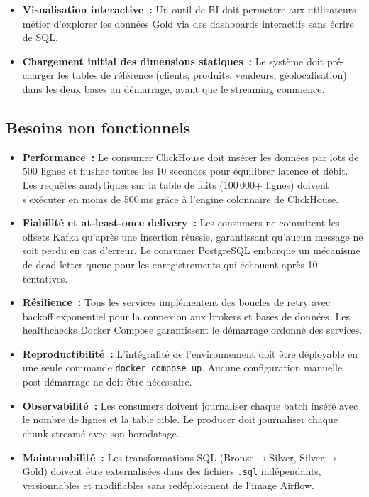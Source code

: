 \begin{itemize}
\item \textbf{Visualisation interactive~:} Un outil de BI doit permettre aux utilisateurs métier d'explorer les données Gold via des dashboards interactifs sans écrire de SQL.

\item \textbf{Chargement initial des dimensions statiques~:} Le système doit pré-charger les tables de référence (clients, produits, vendeurs, géolocalisation) dans les deux bases au démarrage, avant que le streaming commence.

\end{itemize}

\subsection{Besoins non fonctionnels}

\begin{itemize}
\renewcommand{\labelitemi}{$\bullet$}
  \setlength{\itemsep}{0.4em}

\item \textbf{Performance~:} Le consumer ClickHouse doit insérer les données par lots de 500 lignes et flusher toutes les 10 secondes pour équilibrer latence et débit. Les requêtes analytiques sur la table de faits (100\,000+ lignes) doivent s'exécuter en moins de 500\,ms grâce à l'engine colonnaire de ClickHouse.

\item \textbf{Fiabilité et at-least-once delivery~:} Les consumers ne commitent les offsets Kafka qu'après une insertion réussie, garantissant qu'aucun message ne soit perdu en cas d'erreur. Le consumer PostgreSQL embarque un mécanisme de dead-letter queue pour les enregistrements qui échouent après 10 tentatives.

\item \textbf{Résilience~:} Tous les services implémentent des boucles de retry avec backoff exponentiel pour la connexion aux brokers et bases de données. Les healthchecks Docker Compose garantissent le démarrage ordonné des services.

\item \textbf{Reproductibilité~:} L'intégralité de l'environnement doit être déployable en une seule commande \texttt{docker compose up}. Aucune configuration manuelle post-démarrage ne doit être nécessaire.

\item \textbf{Observabilité~:} Les consumers doivent journaliser chaque batch inséré avec le nombre de lignes et la table cible. Le producer doit journaliser chaque chunk streamé avec son horodatage.

\item \textbf{Maintenabilité~:} Les transformations SQL (Bronze$\rightarrow$Silver, Silver$\rightarrow$Gold) doivent être externalisées dans des fichiers \texttt{.sql} indépendants, versionnables et modifiables sans redéploiement de l'image Airflow.

\end{itemize}

